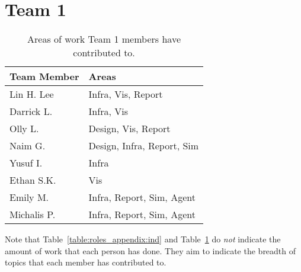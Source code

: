 \section{Team 1}
\label{sec:roles_appendix:team1}

\begin{table}[H]
    \centering
    \begin{tabular}{|l|l|}
    \hline
    \textbf{Team Member} & \textbf{Areas}     \\ \hline
    Lin H. Lee  & Infra, Vis, Report         \\
    Darrick L.  & Infra, Vis                 \\
    Olly L.     & Design, Vis, Report        \\
    Naim G.     & Design, Infra, Report, Sim \\
    Yusuf I.    & Infra                      \\
    Ethan S.K.  & Vis                        \\
    Emily M.    & Infra, Report, Sim, Agent  \\
    Michalis P. & Infra, Report, Sim, Agent  \\ \hline
\end{tabular}
\caption{Areas of work Team 1 members have contributed to.}
\label{sec:roles_appendix:team1}
\end{table}



Note that Table~\ref{table:roles_appendix:ind} and Table~\ref{sec:roles_appendix:team1} do \emph{not} indicate the amount of work that each person has done. They aim to indicate the breadth of topics that each member has contributed to. 
